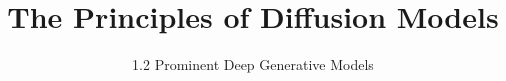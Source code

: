 ﻿%

\title{The Principles of Diffusion Models}
\subtitle{1.2 Prominent Deep Generative Models}


\begin{frame}
    \titlepage
\end{frame}


